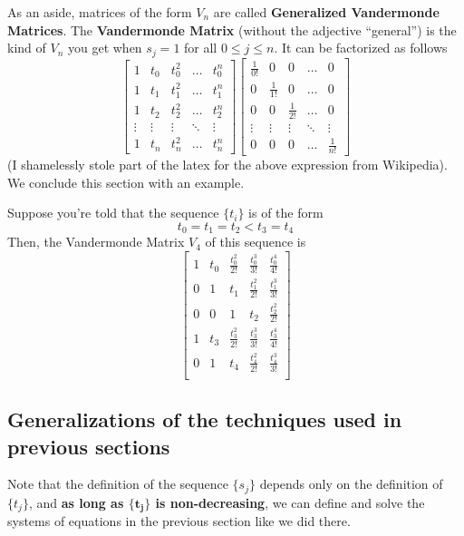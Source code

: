 As an aside, matrices of the form $V_n$ are called \textbf{Generalized Vandermonde Matrices}. The \textbf{Vandermonde Matrix} (without the adjective ``general'') is the kind of $V_n$ you get when $s_j = 1$ for all $0 \leq j \leq n$. It can be factorized as follows
\[
  \begin{bmatrix}
    1 & t_0 & t_0^2 & \dots & t_0^{n}\\
    1 & t_1 & t_1^2 & \dots & t_1^{n}\\
    1 & t_2 & t_2^2 & \dots & t_2^{n}\\
    \vdots & \vdots & \vdots & \ddots &\vdots \\
    1 & t_n & t_n^2 & \dots & t_n^{n}
  \end{bmatrix}
  \begin{bmatrix}
    \frac{1}{0!} & 0 & 0 & \dots & 0\\
    0 & \frac{1}{1!} & 0 & \dots & 0\\
    0 & 0 & \frac{1}{2!} & \dots & 0\\
    \vdots & \vdots & \vdots & \ddots &\vdots \\
    0 & 0 & 0 & \dots & \frac{1}{n!}
  \end{bmatrix}
\]
(I shamelessly stole part of the latex for the above expression from Wikipedia). We conclude this section with an example.
\begin{example}
  Suppose you're told that the sequence $\{t_i \}$ is of the form
  \[
    t_0 = t_1 = t_2 < t_3 = t_4
  \]
  Then, the Vandermonde Matrix $V_4$ of this sequence is
  \[
    \begin{bmatrix}
      1 & t_0 & \frac{t_0^2}{2!} & \frac{t_0^3}{3!} & \frac{t_0^4}{4!} \\[4pt]
      0 & 1 & t_1 & \frac{t_1^2}{2!} & \frac{t_1^3}{3!} \\[4pt]
      0 & 0 & 1 & t_2 & \frac{t_2^2}{2!} \\[4pt]
      1 & t_3 & \frac{t_3^2}{2!} & \frac{t_3^3}{3!} & \frac{t_3^4}{4!} \\[4pt]
      0 & 1 & t_4 & \frac{t_4^2}{2!} & \frac{t_4^3}{3!} \\[4pt]
    \end{bmatrix}
  \]
\end{example}

\subsection{Generalizations of the techniques used in previous sections}
Note that the definition of the sequence $\{s_j \}$ depends only on the definition of $\{t_j \}$, and \textbf{as long as $\bm{\{t_j \}}$ is non-decreasing}, we can define and solve the systems of equations in the previous section like we did there.

